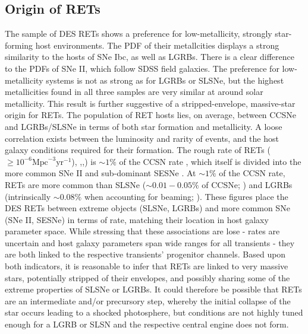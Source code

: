 \documentclass[fleqn,usenatbib,]{mnras}
\newcommand{\replychris}[1]{\color{magenta}#1 \color{black}}
\begin{document}
\subsection{Origin of RETs \label{subsec:disc_origin}}

The sample of DES RETs shows a preference for low-metallicity, strongly star-forming host environments. The PDF of their metallcities displays a strong similarity to the hosts of SNe Ibc, as well as LGRBs. There is a clear difference to the PDFs of SNe II, which follow SDSS field galaxies. The preference for low-metallicity systems is not as strong as for LGRBs or SLSNe, but the highest metallicities found in all three samples are very similar at around solar metallicity. This result is further suggestive of a stripped-envelope, massive-star origin for RETs. 
The population of RET hosts lies, on average, between CCSNe and LGRBs/SLSNe in terms of both star formation and metallicity. A loose correlation exists between the luminosity and rarity of events, and the host galaxy conditions required for their formation. The rough rate of RETs ($\geq 10^{-6} \mathrm{Mpc}^{-3} \mathrm{yr}^{-1}$), \citealt{Drout2014},,\citealt{Tampo2020}) is $\sim1\%$ of the CCSN rate \citep{Li2011,Horiuchi2011,Strolger2015}, which itself is divided into the more common SNe II and sub-dominant SESNe \citep{Kelly2012,Frohmaier2020}. At $\sim1\%$ of the CCSN rate, RETs are more common than SLSNe ($\sim0.01 - 0.05\%$ of CCSNe; \citealt{McCrum2015,Prajs2017,Frohmaier2020}) and LGRBs (intrinsically $\sim0.08\%$ when accounting for beaming; \citealt{Graham2016}). These figures place the DES RETs between extreme objects (SLSNe, LGRBs) and more common SNe (SNe II, SESNe) in terms of rate, matching their location in host galaxy parameter space. While stressing that these associations are lose - rates are uncertain and host galaxy parameters span wide ranges for all transients - they are both linked to the respective transients' progenitor channels. Based upon both indicators, it is reasonable to infer that RETs are linked to very massive stars, \replychris{potentially stripped of their envelopes, and possibly sharing some of the extreme properties of} SLSNe or LGRBs. It could therefore be possible that RETs are an intermediate and/or precursory step, whereby the initial collapse of the star occurs leading to a shocked photosphere, but conditions are not highly tuned enough for a LGRB or SLSN and the respective central engine does not form. 
\end{document}

